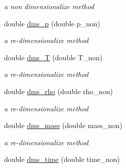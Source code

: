 \begin{CompactItemize}
\begin{CompactList}\small\item\em a non dimensionalize method \item\end{CompactList}\item 
\hypertarget{classInitiation_282fa06b6cb9769ceb01a2b22976126f}{
double \hyperlink{classInitiation_282fa06b6cb9769ceb01a2b22976126f}{dms\_\-p} (double p\_\-non)}
\label{classInitiation_282fa06b6cb9769ceb01a2b22976126f}

\begin{CompactList}\small\item\em a re-dimensionalize method \item\end{CompactList}\item 
\hypertarget{classInitiation_f769934489a9293b6059072bf0e26ae7}{
double \hyperlink{classInitiation_f769934489a9293b6059072bf0e26ae7}{dms\_\-T} (double T\_\-non)}
\label{classInitiation_f769934489a9293b6059072bf0e26ae7}

\begin{CompactList}\small\item\em a re-dimensionalize method \item\end{CompactList}\item 
\hypertarget{classInitiation_4d77129052a63bf33ad36638aaa47972}{
double \hyperlink{classInitiation_4d77129052a63bf33ad36638aaa47972}{dms\_\-rho} (double rho\_\-non)}
\label{classInitiation_4d77129052a63bf33ad36638aaa47972}

\begin{CompactList}\small\item\em a re-dimensionalize method \item\end{CompactList}\item 
\hypertarget{classInitiation_e28be0f6a53920bdab379301eb414990}{
double \hyperlink{classInitiation_e28be0f6a53920bdab379301eb414990}{dms\_\-mass} (double mass\_\-non)}
\label{classInitiation_e28be0f6a53920bdab379301eb414990}

\begin{CompactList}\small\item\em a re-dimensionalize method \item\end{CompactList}\item 
\hypertarget{classInitiation_0e76e3a9e585398854689d151b4af2d8}{
double \hyperlink{classInitiation_0e76e3a9e585398854689d151b4af2d8}{dms\_\-time} (double time\_\-non)}
\label{classInitiation_0e76e3a9e585398854689d151b4af2d8}


\end{CompactItemize}

